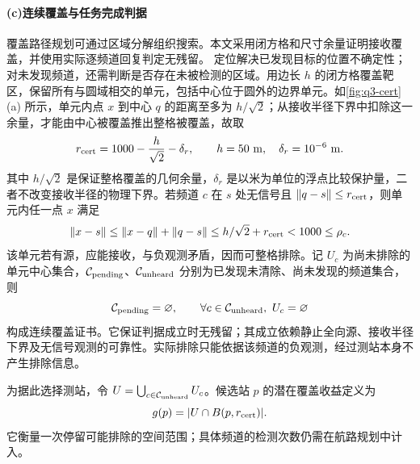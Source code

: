 \paragraph{\textbf{(c)}\hspace{0.2em}连续覆盖与任务完成判据}
覆盖路径规划可通过区域分解组织搜索\cite{galceran2013,choset2000}。本文采用闭方格和尺寸余量证明接收覆盖，并使用实际逐频道回复判定无残留。
定位解决已发现目标的位置不确定性；对未发现频道，还需判断是否存在未被检测的区域。用边长 $h$ 的闭方格覆盖靶区，保留所有与圆域相交的单元，包括中心位于圆外的边界单元。如\cref{fig:q3-cert}(a) 所示，单元内点 $x$ 到中心 $q$ 的距离至多为 $h/\sqrt2$；从接收半径下界中扣除这一余量，才能由中心被覆盖推出整格被覆盖，故取
\begin{equation}\label{eq:q3-cert-radius}
 r_{\rm cert}=1000-\frac h{\sqrt2}-\delta_r,\qquad
 h=50\ \mathrm{m},\quad\delta_r=10^{-6}\ \mathrm{m}.
\end{equation}
其中 $h/\sqrt2$ 是保证整格覆盖的几何余量，$\delta_r$ 是以米为单位的浮点比较保护量，二者不改变接收半径的物理下界。若频道 $c$ 在 $s$ 处无信号且 $\|q-s\|\le r_{\rm cert}$，则单元内任一点 $x$ 满足
\begin{equation}\label{eq:q3-cert-proof}
 \|x-s\|\le\|x-q\|+\|q-s\|
 \le h/\sqrt2+r_{\rm cert}<1000\le\rho_c.
\end{equation}
该单元若有源，应能接收，与负观测矛盾，因而可整格排除。记 $U_c$ 为尚未排除的单元中心集合，$\mathcal C_{\rm pending}$、$\mathcal C_{\rm unheard}$ 分别为已发现未清除、尚未发现的频道集合，则
\begin{equation}\label{eq:q3-stop}
 \mathcal C_{\rm pending}=\varnothing,\qquad
 \forall c\in \mathcal C_{\rm unheard},\ U_c=\varnothing
\end{equation}
构成连续覆盖证书。它保证判据成立时无残留；其成立依赖静止全向源、接收半径下界及无信号观测的可靠性。实际排除只能依据该频道的负观测，经过测站本身不产生排除信息。

为据此选择测站，令 $U=\bigcup_{c\in \mathcal C_{\rm unheard}}U_c$。候选站 $p$ 的潜在覆盖收益定义为
\begin{equation}\label{eq:q3-gain}
 g(p)=|U\cap B(p,r_{\rm cert})|.
\end{equation}
它衡量一次停留可能排除的空间范围；具体频道的检测次数仍需在航路规划中计入。

